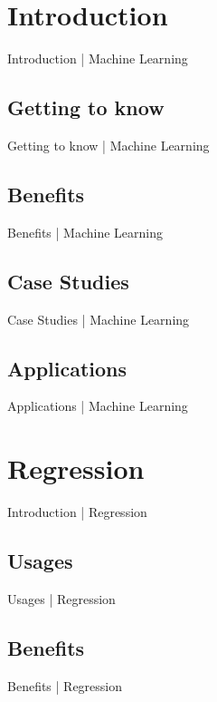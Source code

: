\documentclass[10pt]{beamer}
\begin{document}
	\section{Introduction}
		\begin{frame}{Introduction | Machine Learning}
		\end{frame}
		\subsection{Getting to know}
			\begin{frame}{Getting to know | Machine Learning}
			\end{frame}
		\subsection{Benefits}
			\begin{frame}{Benefits | Machine Learning}
			\end{frame}
		\subsection{Case Studies}
			\begin{frame}{Case Studies | Machine Learning}
			\end{frame}
		\subsection{Applications}
			\begin{frame}{Applications | Machine Learning}
			\end{frame}
	
	\section{Regression}
		\begin{frame}{Introduction | Regression}
		\end{frame}
		\subsection{Usages}
			\begin{frame}{Usages | Regression}
			\end{frame}
		\subsection{Benefits}
			\begin{frame}{Benefits | Regression}
			\end{frame}
\end{document}
